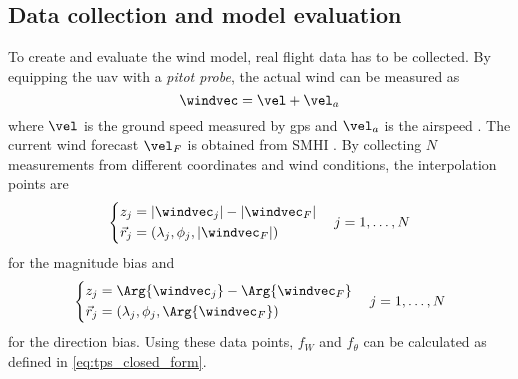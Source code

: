 \subsection{Data collection and model evaluation}
To create and evaluate the wind model, real flight data has to be collected. By equipping the \ac{uav} with a \textit{pitot probe}, the actual wind can be measured as
\begin{equation}
    \windvec=\vel + \vel_a
\end{equation}
where $\vel$ is the ground speed measured by \ac{gps} and $\vel_a$ is the airspeed \cite{spline_trajectory}. The current wind forecast $\vel_F$ is obtained from SMHI \cite{smhi}. By collecting $N$ measurements from different coordinates and wind conditions, the interpolation points are
\begin{equation}
    \left\{
    \begin{aligned}
        z_{j}&=|\windvec_j| - |\windvec_F| \\
        \vec{r}_{j}&=(\lambda_j,\phi_j,|\windvec_F|)
    \end{aligned}
    \right.
    \quad j=1,\ldots,N
\end{equation}
for the magnitude bias and
\begin{equation}
    \left\{
    \begin{aligned}
        z_{j}&=\Arg{\windvec_j} - \Arg{\windvec_F} \\
        \vec{r}_{j}&=(\lambda_j,\phi_j,\Arg{\windvec_F})
    \end{aligned}
    \right.
    \quad j=1,\ldots,N
\end{equation}
for the direction bias. Using these data points, $f_W$ and $f_\theta$ can be calculated as defined in \eqref{eq:tps_closed_form}.